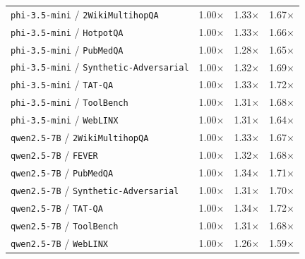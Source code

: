 \begin{longtable}{lccc}
\texttt{phi-3.5-mini} / \texttt{2WikiMultihopQA} & 1.00$\times$ & 1.33$\times$ & 1.67$\times$ \\
\texttt{phi-3.5-mini} / \texttt{HotpotQA} & 1.00$\times$ & 1.33$\times$ & 1.66$\times$ \\
\texttt{phi-3.5-mini} / \texttt{PubMedQA} & 1.00$\times$ & 1.28$\times$ & 1.65$\times$ \\
\texttt{phi-3.5-mini} / \texttt{Synthetic-Adversarial} & 1.00$\times$ & 1.32$\times$ & 1.69$\times$ \\
\texttt{phi-3.5-mini} / \texttt{TAT-QA} & 1.00$\times$ & 1.33$\times$ & 1.72$\times$ \\
\texttt{phi-3.5-mini} / \texttt{ToolBench} & 1.00$\times$ & 1.31$\times$ & 1.68$\times$ \\
\texttt{phi-3.5-mini} / \texttt{WebLINX} & 1.00$\times$ & 1.31$\times$ & 1.64$\times$ \\
\texttt{qwen2.5-7B} / \texttt{2WikiMultihopQA} & 1.00$\times$ & 1.33$\times$ & 1.67$\times$ \\
\texttt{qwen2.5-7B} / \texttt{FEVER} & 1.00$\times$ & 1.32$\times$ & 1.68$\times$ \\
\texttt{qwen2.5-7B} / \texttt{PubMedQA} & 1.00$\times$ & 1.34$\times$ & 1.71$\times$ \\
\texttt{qwen2.5-7B} / \texttt{Synthetic-Adversarial} & 1.00$\times$ & 1.31$\times$ & 1.70$\times$ \\
\texttt{qwen2.5-7B} / \texttt{TAT-QA} & 1.00$\times$ & 1.34$\times$ & 1.72$\times$ \\
\texttt{qwen2.5-7B} / \texttt{ToolBench} & 1.00$\times$ & 1.31$\times$ & 1.68$\times$ \\
\texttt{qwen2.5-7B} / \texttt{WebLINX} & 1.00$\times$ & 1.26$\times$ & 1.59$\times$ \\
\bottomrule
\end{longtable}
